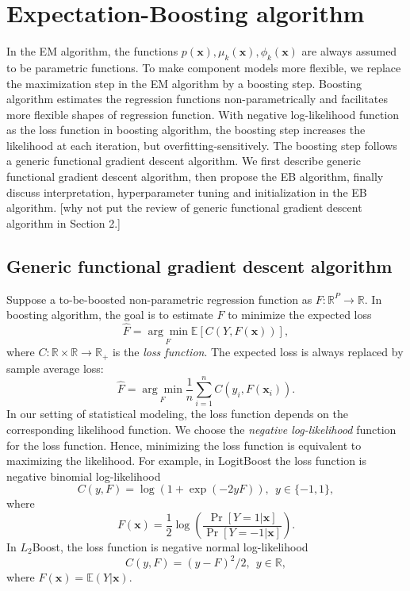 \documentclass[11pt]{article}
\numberwithin{equation}{section}
\def\R{{\mathbb R}}  %
\def\E{{\mathbb E}}  %
\def\bx{\boldsymbol{x}}
\begin{document}
\section{Expectation-Boosting algorithm}\label{sec:EB}
In the EM algorithm, the functions $p(\bx), \mu_k(\bx), \phi_k(\bx)$ are always assumed to be parametric functions.
To make component models more flexible, we replace the maximization step in the EM algorithm by a boosting step.
Boosting algorithm estimates the regression functions non-parametrically and facilitates more flexible shapes of regression function.
With negative log-likelihood function as the loss function in boosting algorithm, the boosting step increases the likelihood at each iteration, but overfitting-sensitively.
The boosting step follows a generic functional gradient descent algorithm.
We first describe generic functional gradient descent algorithm, then propose the EB algorithm, finally discuss interpretation, hyperparameter tuning and initialization in the EB algorithm. {\color{blue}[why not put the review of generic functional gradient descent algorithm in Section 2.]}

\subsection{Generic functional gradient descent algorithm}

	Suppose a to-be-boosted {non-parametric regression function} as $F:\R^P\rightarrow\R$. In boosting algorithm, the goal is to  estimate $F$ to minimize the expected loss $$\hat{F}=\underset{F}{\arg\min}\E\left[C(Y,F(\bx))\right],$$
	where $C:\R\times\R\rightarrow\R_+$ is the \textit{loss function}.
	The expected loss is always replaced by sample average loss:
	$$\hat{F}=\underset{F}{\arg\min}\frac{1}{n}\sum_{i=1}^nC(y_i,F(\bx_i)).$$
	In our setting of statistical modeling, the loss function depends on the corresponding likelihood function.
	We choose the \textit{negative log-likelihood} function for the loss function. Hence, minimizing the loss function is equivalent to maximizing the likelihood.
For example, in LogitBoost the loss function is negative binomial log-likelihood
$$C(y,F)=\log(1+\exp(-2yF)), ~~ y\in\{-1,1\},$$
where 
\begin{equation}\label{logit-link}
F(\bx)=\frac{1}{2}\log\left(\frac{\Pr[Y=1|\bx]}{\Pr[Y=-1|\bx]}\right).
\end{equation}
In $L_2$Boost, the loss function is negative normal log-likelihood
\begin{equation}\label{l2}
	C(y,F)=(y-F)^2/2, ~~ y\in \R,
\end{equation}
where $F(\bx)=\E(Y|\bx).$
\end{document}
